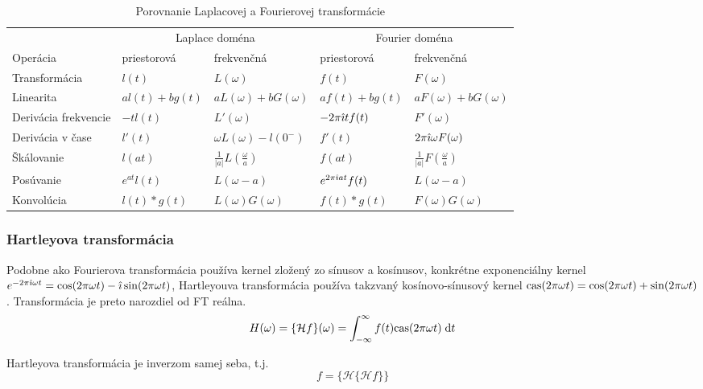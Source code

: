 \begin{sidewaystable}[htp]
    \begin{tabular}{l l l l l}
    & \multicolumn{2}{c}{Laplace doména}
    & \multicolumn{2}{c}{Fourier doména} \\
    Operácia & priestorová& frekvenčná&
        priestorová & frekvenčná \\
    Transformácia &
        $l(t)$ & $L(\omega)$ &
        $f(t)$ & $F(\omega)$ \\
    Linearita &
        $a l(t) + b g(t)$ & $a L(\omega) + b G(\omega)$ &
        $a f(t) + b g(t)$ & $a F(\omega) + b G(\omega)$ \\
    Derivácia frekvencie &
        $-t l(t)$ & $L'(\omega)$ &
        $-2\pi\hat{\imath} t f(t) $ & $F'(\omega)$\\
    Derivácia v čase &
        $l'(t)$ & $\omega L(\omega) - l(0^{-})$ &
        $f'(t)$ & $2\pi\hat{\imath}\omega F(\omega)$\\
    Škálovanie &
        $l(at)$ & $\frac{1}{|a|} L(\frac{\omega}{a})$ &
        $f(at)$ & $\frac{1}{|a|} F(\frac{\omega}{a})$\\
    Posúvanie &
        $e^{a t} l(t)$ & $L(\omega -a)$ &
        $e^{2\pi\hat{\imath} at} f(t)$ & $L(\omega - a)$\\
    Konvolúcia &
        $l(t)*g(t)$ & $L(\omega)G(\omega)$ &
        $f(t)*g(t)$ & $F(\omega)G(\omega)$
    \end{tabular}
    \label{tab:laplace_vs_fourier}
    \caption{Porovnanie Laplacovej a Fourierovej transformácie}
\end{sidewaystable}

\subsubsection{Hartleyova transformácia}
Podobne ako Fourierova transformácia používa kernel zložený zo sínusov
a kosínusov, konkrétne exponenciálny kernel $e^{-2\pi \hat{\imath}\omega t}=
\cos(2\pi \omega t) -\hat{\imath} \sin(2 \pi \omega t)$, Hartleyouva
transformácia používa takzvaný kosínovo-sínusový kernel
\newcommand{\cas}{{\rm cas}}
$\cas(2 \pi \omega t)=\cos(2 \pi \omega t) + \sin(2 \pi \omega t)$.
Transformácia je preto narozdiel od FT reálna.
\begin{equation*}
 H(\omega) = \{\mathcal{H} f\}(\omega) =
    \intinfinf f(t) \cas(2 \pi \omega t) \dd t
\end{equation*}

Hartleyova transformácia je inverzom samej seba, t.j.
\begin{equation*}
    f = \{\mathcal{H}\{\mathcal{H} f\}\}
\end{equation*}

